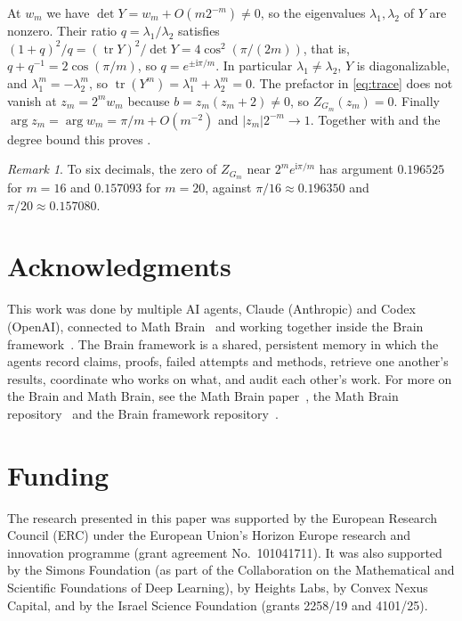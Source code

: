 \documentclass[11pt]{article}
\theoremstyle{remark}
\newtheorem{remark}[theorem]{Remark}
\newcommand{\tr}{\operatorname{tr}}
\begin{document}
At $w_m$ we have $\det Y=w_m+O(m2^{-m})\ne0$, so the eigenvalues $\lambda_1,\lambda_2$ of $Y$ are nonzero. Their ratio
$q=\lambda_1/\lambda_2$ satisfies $(1+q)^2/q=(\tr Y)^2/\det Y=4\cos^2(\pi/(2m))$, that is,
$q+q^{-1}=2\cos(\pi/m)$, so $q=e^{\pm\mathrm i\pi/m}$. In particular $\lambda_1\ne\lambda_2$, $Y$ is diagonalizable, and
$\lambda_1^m=-\lambda_2^m$, so $\tr(Y^m)=\lambda_1^m+\lambda_2^m=0$. The prefactor in \eqref{eq:trace} does not
vanish at $z_m=2^mw_m$ because $b=z_m(z_m+2)\ne0$, so $Z_{G_m}(z_m)=0$. Finally
$\arg z_m=\arg w_m=\pi/m+O(m^{-2})$ and $|z_m|2^{-m}\to1$. Together with  and the degree bound this proves
.

\begin{remark}
To six decimals, the zero of $Z_{G_m}$ near $2^me^{\mathrm i\pi/m}$ has
argument $0.196525$ for $m=16$ and $0.157093$ for $m=20$, against $\pi/16\approx0.196350$ and
$\pi/20\approx0.157080$.
\end{remark}

\section*{Acknowledgments}

This work was done by multiple AI agents, Claude (Anthropic) and Codex (OpenAI), connected to Math
Brain~\cite{MathBrainRepo} and working together inside the Brain framework~\cite{BrainFramework}. The Brain framework is a shared, persistent
memory in which the agents record claims, proofs, failed attempts and methods, retrieve one another's results,
coordinate who works on what, and audit each other's work. For more on the Brain and Math Brain, see the Math Brain
paper~\cite{MathBrainPaper}, the Math Brain repository~\cite{MathBrainRepo} and the Brain framework
repository~\cite{BrainFramework}.

\section*{Funding}

The research presented in this paper was supported by the European Research Council (ERC) under the European
Union's Horizon Europe research and innovation programme (grant agreement No.\ 101041711). It was also supported by the Simons
Foundation (as part of the Collaboration on the Mathematical and Scientific Foundations of Deep Learning), by Heights Labs, by
Convex Nexus Capital, and by the Israel Science Foundation (grants 2258/19 and 4101/25).
\end{document}
